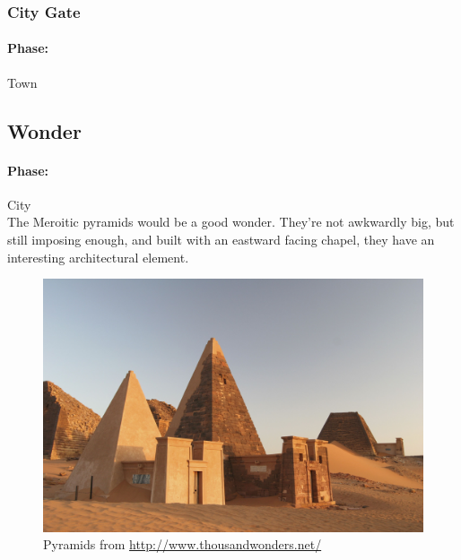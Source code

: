 \documentclass[a4paper,12pt]{scrreprt}
\begin{document}
\subsubsection{City Gate}

\paragraph{Phase:} Town\\

\subsection{Wonder}

\paragraph{Phase:} City\\

The Meroitic pyramids would be a good wonder. They’re not awkwardly big, but still imposing enough, and built with an eastward facing chapel, they have an interesting architectural element.

\begin{figure}[H]
	\centering
	\includegraphics[width=\textwidth]{img/wonder/nubian_pyramids_original}
	\caption{Pyramids from \url{http://www.thousandwonders.net/}}
\end{figure}
\end{document}
